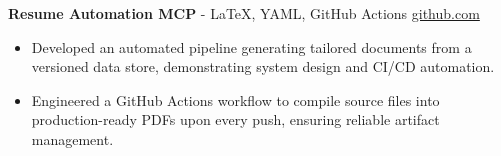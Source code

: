 \documentclass[11pt]{article}       %
\begin{document}

\textbf{Resume Automation MCP}{ - LaTeX, YAML, GitHub Actions} \hfill \href{https://github.com/Monica20030707/Tex_OrangeLeaf-mcp}{github.com} \\
\vspace{-9pt}
\begin{itemize}
  \item Developed an automated pipeline generating tailored documents from a versioned data store, demonstrating system design and CI/CD automation.
  \item Engineered a GitHub Actions workflow to compile source files into production-ready PDFs upon every push, ensuring reliable artifact management.
\end{itemize}
\end{document}

